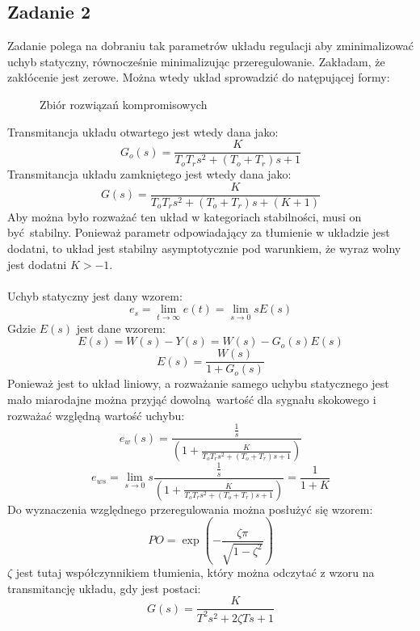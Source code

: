 \documentclass[a4paper, 12pt]{article}
\begin{document}
        \subsection{Zadanie 2}
            Zadanie polega na dobraniu tak parametrów układu regulacji aby zminimalizować uchyb
            statyczny, równocześnie minimalizując przeregulowanie. Zakładam, że zakłócenie jest
            zerowe. Można wtedy układ sprowadzić do natępującej formy:
            \begin{figure}[H]
                \centering
                \def \svgwidth{0.7\columnwidth}
                
                \caption{Zbiór rozwiązań kompromisowych}
            \end{figure}\noindent
            Transmitancja układu otwartego jest wtedy dana jako:
            $$
                G_o(s) = \frac{K}{T_oT_rs^2 + (T_o + T_r)s + 1}
            $$
            Transmitancja układu zamkniętego jest wtedy dana jako:
            $$
                G(s) = \frac{K}{T_oT_rs^2 + (T_o + T_r)s + (K + 1)}
            $$
            Aby można było rozważać ten układ w kategoriach stabilności, musi on być stabilny. Ponieważ
            parametr odpowiadający za tłumienie w układzie jest dodatni, to układ jest stabilny
            asymptotycznie pod warunkiem, że wyraz wolny jest dodatni $K > -1$.
            \\ \\
            Uchyb statyczny jest dany wzorem:
            $$
                e_s =  \lim_{t \to \infty} e(t) = \lim_{s \to 0} sE(s)
            $$
            Gdzie $E(s)$ jest dane wzorem:
            $$
                E(s) = W(s) - Y(s) = W(s) - G_o(s) E(s)
            $$
            $$
                E(s) = \frac{W(s)}{1 + G_o(s)}
            $$
            Ponieważ jest to układ liniowy, a rozważanie samego uchybu statycznego jest mało miarodajne
            można przyjąć dowolną wartość dla sygnału skokowego i rozważać względną wartość uchybu:
            $$
                e_w(s) = \frac{\frac{1}{s}}{(1 + \frac{K}{T_oT_rs^2 + (T_o + T_r)s + 1})}
            $$
            $$
                e_{ws} = \lim_{s \to 0} s \frac{\frac{1}{s}}{(1 + \frac{K}{T_oT_rs^2 + 
                    (T_o + T_r)s + 1})} = \frac{1}{1 + K}
            $$
            Do wyznaczenia względnego przeregulowania można posłużyć się wzorem:
            $$
                PO = \exp\left(
                    - \frac{\zeta \pi}{\sqrt{1 - \zeta^2}}
                \right)
            $$
            $\zeta$ jest tutaj współczynnikiem tłumienia, który można odczytać z wzoru na transmitancję
            układu, gdy jest postaci:
            $$
                G(s) = \frac{K}{T^2s^2 + 2\zeta Ts + 1}
            $$
\end{document}
